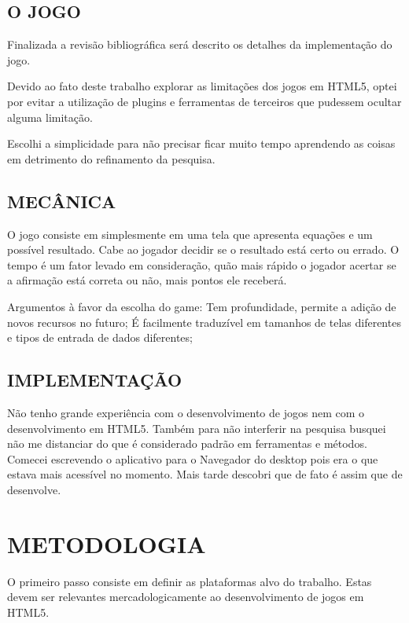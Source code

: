 \documentclass[
12pt,
a4paper,
portuges,
draft
]{report}
\begin{document}

\section{O JOGO}
Finalizada a revisão bibliográfica será descrito os detalhes da implementação do jogo.

Devido ao fato deste trabalho explorar as limitações dos jogos em
HTML5, optei por evitar a utilização de plugins e ferramentas de
terceiros que pudessem ocultar alguma limitação.

Escolhi a simplicidade para não precisar ficar muito tempo aprendendo
as coisas em detrimento do refinamento da pesquisa.

\section{MECÂNICA}

O jogo consiste em simplesmente em uma tela que apresenta equações e
um possível resultado. Cabe ao jogador decidir se o resultado está
certo ou errado. O tempo é um fator levado em consideração, quão
mais rápido o jogador acertar se a afirmação está correta ou não,
mais pontos ele receberá.

Argumentos à favor da escolha do game: Tem profundidade, permite a
adição de novos recursos no futuro;
É facilmente traduzível em tamanhos de telas diferentes e tipos de
entrada de dados diferentes;

\section{IMPLEMENTAÇÃO}

Não tenho grande experiência com o desenvolvimento de jogos nem com
o desenvolvimento em HTML5. Também para não interferir na pesquisa
busquei não me distanciar do que é considerado padrão em ferramentas
e métodos.
Comecei escrevendo o aplicativo para o Navegador do desktop pois era o
que estava mais acessível no momento. Mais tarde descobri que de fato
é assim que de desenvolve.


\chapter{METODOLOGIA}
\thispagestyle{myheadings}

O primeiro passo consiste em definir as plataformas alvo do trabalho.
Estas devem ser relevantes mercadologicamente ao desenvolvimento de jogos em HTML5.
\end{document}
